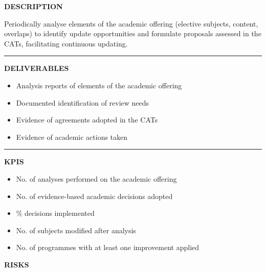 \documentclass[11pt,a4paper]{scrreprt}
\newcommand{\fieldlabel}[1]{%
  {\footnotesize\sffamily\bfseries\color{mutedcolor}\MakeUppercase{#1}}\par\nopagebreak[4]
}
\newcommand{\fieldsep}{\vspace{3pt}\noindent\textcolor{bordercolor}{\rule{\linewidth}{0.4pt}}\vspace{3pt}\par}
\begin{document}
\begin{tcolorbox}[pabox={aacolor}{A.P.5.1 \enspace\textbullet\enspace Review and Proposal for Updating the Academic Offering}]

\fieldlabel{Description}
{\small Periodically analyse elements of the academic offering (elective subjects, content, overlaps) to identify update opportunities and formulate proposals assessed in the CATs, facilitating continuous updating.}\par
\fieldsep
\fieldlabel{Deliverables}
{\small \begin{itemize}[noitemsep,topsep=2pt]
\item Analysis reports of elements of the academic offering
\item Documented identification of review needs
\item Evidence of agreements adopted in the CATs
\item Evidence of academic actions taken
\end{itemize}}\par
\fieldsep
\fieldlabel{KPIs}
{\small \begin{itemize}[noitemsep,topsep=2pt]
\item No. of analyses performed on the academic offering
\item No. of evidence-based academic decisions adopted
\item \% decisions implemented
\item No. of subjects modified after analysis
\item No. of programmes with at least one improvement applied
\end{itemize}}\par
\end{tcolorbox}
\begin{tcolorbox}[riskbox]
{\footnotesize\sffamily\bfseries\color{red!50!black} RISKS}\par{}
\end{tcolorbox}
\end{document}
